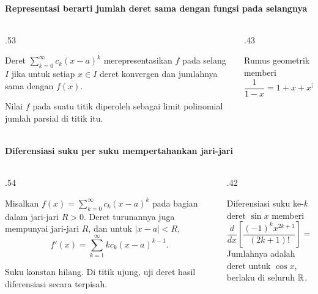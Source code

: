 \documentclass{../../kalkulus-ppt}
\begin{document}
\begin{frame}{\insertsection}
    \framesubtitle{Representasi berarti jumlah deret sama dengan fungsi pada selangnya}
    \begin{columns}[c,onlytextwidth]
        \begin{column}{.53\textwidth}
            \begin{definisi}
                Deret $\sum_{k=0}^{\infty}c_k(x-a)^k$
                merepresentasikan $f$ pada selang $I$ jika
                untuk setiap $x\in I$ deret konvergen dan
                jumlahnya sama dengan $f(x)$.
            \end{definisi}
            Nilai $f$ pada suatu titik diperoleh sebagai
            limit polinomial jumlah parsial di titik itu.
        \end{column}
        \begin{column}{.43\textwidth}
            \begin{contoh}
                Rumus geometrik memberi
                \[
                    \frac1{1-x}=1+x+x^2+x^3+\cdots
                    \quad (|x|<1).
                \]
            \end{contoh}
        \end{column}
    \end{columns}
\end{frame}

\begin{frame}{\insertsection}
    \framesubtitle{Diferensiasi suku per suku mempertahankan jari-jari}
    \begin{columns}[c,onlytextwidth]
        \begin{column}{.54\textwidth}
            \begin{teorema}
                Misalkan $f(x)=\sum_{k=0}^\infty c_k(x-a)^k$
                pada bagian dalam jari-jari $R>0$.
                Deret turunannya juga mempunyai jari-jari $R$,
                dan untuk $|x-a|<R$,
                \[
                    f'(x)=\sum_{k=1}^\infty k c_k(x-a)^{k-1}.
                \]
            \end{teorema}
            Suku konstan hilang. Di titik ujung, uji deret hasil
            diferensiasi secara terpisah.
        \end{column}
        \begin{column}{.42\textwidth}
            \begin{contoh}
                Diferensiasi suku ke-$k$ deret $\sin x$ memberi
                \[
                    \frac{d}{dx}\left[\frac{(-1)^kx^{2k+1}}{(2k+1)!}\right]
                    =\frac{(-1)^k x^{2k}}{(2k)!}.
                \]
                Jumlahnya adalah deret untuk $\cos x$,
                berlaku di seluruh $\mathbb{R}$.
            \end{contoh}
        \end{column}
    \end{columns}
\end{frame}
\end{document}
